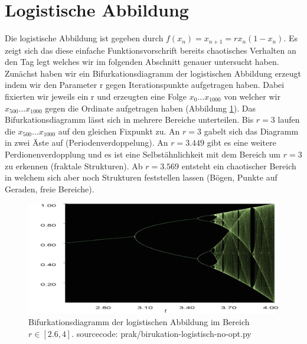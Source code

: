 \documentclass{scrartcl}
\begin{document}
\section{Logistische Abbildung}
Die logistische Abbildung ist gegeben durch $f(x_n)=x_{n+1}=rx_n(1-x_n)$. Es zeigt sich das diese einfache Funktionsvorschrift 
bereits chaotisches Verhalten an den Tag legt welches wir im folgenden Abschnitt genauer untersucht haben. Zunächst haben 
wir ein Bifurkationsdiagramm der logistischen Abbildung erzeugt indem wir den Parameter r gegen Iterationspunkte aufgetragen haben. Dabei fixierten wir jeweils ein r und erzeugten eine Folge $x_0 ... x_{1000}$ von welcher wir $x_{500} ... x_{1000}$ gegen die Ordinate aufgetragen haben (Abbildung \ref{fig:bifurkation-sin-nice}).
Das Bifurkationsdiagramm lässt sich in mehrere Bereiche unterteilen. Bis $r=3$ laufen die $x_{500}...x_{1000}$ auf den gleichen Fixpunkt zu. An $r=3$ gabelt sich das Diagramm in zwei Äste auf (Periodenverdoppelung). An $r=3.449$ gibt es eine weitere Perdionenverdopplung und es ist eine Selbstähnlichkeit mit dem Bereich um $r=3$ zu erkennen (fraktale Strukturen). Ab $r=3.569$ entsteht ein chaotischer Bereich in welchem sich aber noch Strukturen feststellen lassen (Bögen, Punkte auf Geraden, freie Bereiche).
\begin{figure}[!htbp]
	\centering
	\includegraphics[scale=0.30]{bifurkation}
	\caption{Bifurkationsdiagramm der logistischen Abbildung im Bereich $r\in[2.6,4]$. sourcecode: prak/birukation-logistisch-no-opt.py}
	\label{fig:bifurkation-sin-nice}
\end{figure}
\end{document}
